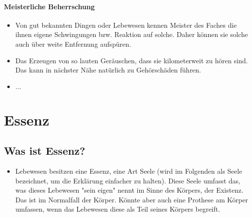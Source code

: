 \subsubsection{Meisterliche Beherrschung} 
\begin{itemize}
	\item Von gut bekannten Dingen oder Lebewesen kennen Meister des Faches die ihnen eigene Schwingungen bzw. Reaktion auf solche. Daher können sie solche auch über weite Entfernung aufspüren.
	\item Das Erzeugen von so lauten Geräuschen, dass sie kilometerweit zu hören sind. Das kann in nächster Nähe natürlich zu Gehörschäden führen.
	\item ...
\end{itemize}







\chapter{Essenz}
\section{Was ist Essenz?}
\begin{itemize}
	\item Lebewesen besitzen eine Essenz, eine Art Seele (wird im Folgenden als Seele bezeichnet, um die Erklärung einfacher zu halten). Diese Seele umfasst das, was dieses Lebewesen "sein eigen" nennt im Sinne des Körpers, der Existenz. Das ist im Normalfall der Körper. Könnte aber auch eine Prothese am Körper umfassen, wenn das Lebewesen diese als Teil seines Körpers begreift.
\end{itemize}